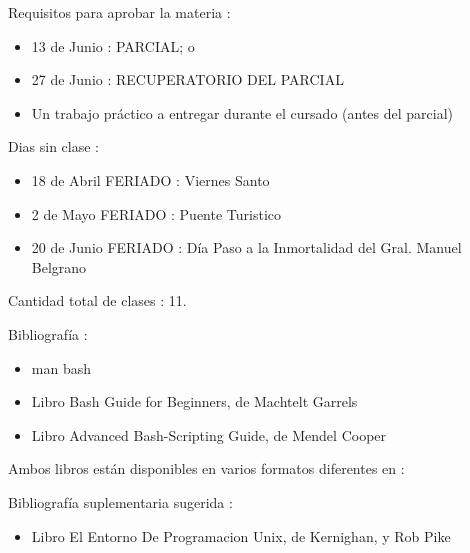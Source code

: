 \documentclass{beamer}
\begin{document}
\begin{frame}{}
Requisitos para aprobar la materia : 
\begin{itemize}
\item 13 de Junio : PARCIAL; o
\item 27 de Junio : RECUPERATORIO DEL PARCIAL
\item Un trabajo práctico a entregar durante el cursado (antes del parcial)
\end{itemize}

Dias sin clase : 
\begin{itemize}
\item 18 de Abril FERIADO : Viernes Santo
\item 2 de Mayo FERIADO : Puente Turistico
\item 20 de Junio FERIADO : Día Paso a la Inmortalidad del Gral. Manuel Belgrano
\end{itemize}
Cantidad total de clases : 11.
\end{frame}

\begin{frame}{}
Bibliografía : 
\begin{itemize}
\item man bash
\item Libro Bash Guide for Beginners, de Machtelt Garrels 
\item Libro Advanced Bash-Scripting Guide, de Mendel Cooper
\end{itemize}

Ambos libros están disponibles en varios formatos diferentes en :

Bibliografía suplementaria sugerida : 
\begin{itemize}
\item Libro El Entorno De Programacion Unix, de Kernighan, y Rob Pike
\end{itemize}

\end{frame}
\end{document}
